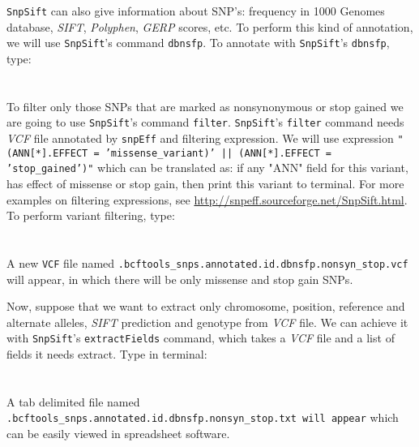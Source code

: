 \texttt{SnpSift} can also give information about SNP's: frequency in 1000 Genomes database,
\textit{SIFT}, \textit{Polyphen}, \textit{GERP} scores, etc. To perform this kind of annotation, we will use \texttt{SnpSift}'s command 
\texttt{dbnsfp}. To annotate with \texttt{SnpSift}'s \texttt{dbnsfp}, type:\\~\\
\\

To filter only those SNPs that are marked as nonsynonymous or stop gained we are going to
use \texttt{SnpSift}'s command \texttt{filter}. \texttt{SnpSift}'s \texttt{filter} command needs
\textit{VCF} file annotated by \texttt{snpEff} and filtering expression.
We will use expression \texttt{"(ANN[*].EFFECT = 'missense\_variant)' || (ANN[*].EFFECT = 'stop\_gained')"}
which can be translated as: if any "ANN" field for this variant, has effect of missense or stop gain, then print this variant
to terminal. For more examples on filtering expressions, see \url{http://snpeff.sourceforge.net/SnpSift.html}.
To perform variant filtering, type:\\~\\
\\

A new \texttt{VCF} file named \texttt{\mapReads.bcftools\_snps.annotated.id.dbnsfp.nonsyn\_stop.vcf} will appear, in which 
there will be only missense and stop gain SNPs.

Now, suppose that we want to extract only chromosome, position, reference and alternate alleles, \textit{SIFT}
prediction and genotype from \textit{VCF} file. We can achieve it with \texttt{SnpSift}'s \texttt{extractFields} command,
which takes a \textit{VCF} file and a list of fields it needs extract. 
Type in terminal:\\~\\
\\

A tab delimited file named \texttt{\mapReads.bcftools\_snps.annotated.id.dbnsfp.nonsyn\_stop.txt will appear}
which can be easily viewed in spreadsheet software.
